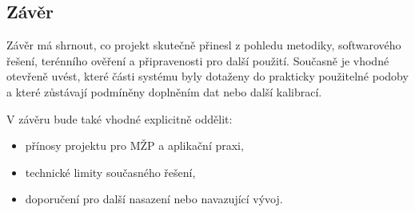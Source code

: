 \documentclass[11pt,a4paper]{article}
\begin{document}
\begin{onehalfspacing}
\section{Závěr}

Závěr má shrnout, co projekt skutečně přinesl z pohledu metodiky,
softwarového řešení, terénního ověření a připravenosti pro další použití.
Současně je vhodné otevřeně uvést, které části systému byly dotaženy do
prakticky použitelné podoby a které zůstávají podmíněny doplněním dat nebo
další kalibrací.

V závěru bude také vhodné explicitně oddělit:

\begin{itemize}
    \item přínosy projektu pro MŽP a aplikační praxi,
    \item technické limity současného řešení,
    \item doporučení pro další nasazení nebo navazující vývoj.
\end{itemize}

\printbibliography[heading=bibintoc,title={Použitá literatura}]

\end{onehalfspacing}
\end{document}
